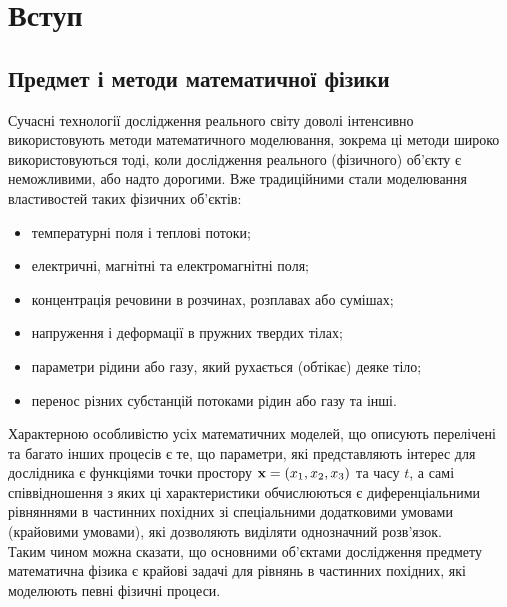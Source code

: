 
\section{Вступ}

\subsection{Предмет і методи математичної фізики}

Сучасні технології дослідження реального світу доволі інтенсивно використовують методи математичного моделювання, зокрема ці методи широко використовуються тоді, коли дослідження реального (фізичного) об’єкту є неможливими, або надто дорогими. Вже традиційними стали моделювання властивостей таких фізичних об’єктів:
\begin{itemize}
	\item температурні поля і теплові потоки;
	\item електричні, магнітні та електромагнітні поля;
	\item концентрація речовини в розчинах, розплавах або сумішах;
	\item напруження і деформації в пружних твердих тілах;
	\item параметри рідини або газу, який рухається (обтікає) деяке тіло;
	\item перенос різних субстанцій потоками рідин або газу та інші.
\end{itemize}

Характерною особливістю усіх математичних моделей, що описують перелічені та багато інших процесів є те, що параметри, які представляють інтерес для дослідника є функціями точки простору $\bf{x} = (x_1, x_2, x_3)$ та часу $t$, а самі співвідношення з яких ці характеристики обчислюються є диференціальними рівняннями в частинних похідних зі спеціальними додатковими умовами (крайовими умовами), які дозволяють виділяти однозначний розв’язок. \\

Таким чином можна сказати, що основними об’єктами дослідження предмету математична фізика є крайові задачі для рівнянь в частинних похідних, які моделюють певні фізичні процеси. \\

